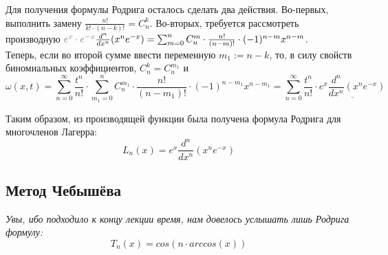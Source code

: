 \documentclass[12pt]{article}
\begin{document}
	Для получения формулы Родрига осталось сделать два действия. Во-первых, выполнить замену $\frac{n!}{k! \cdot (n-k)!} = C_n^k$.
	Во-вторых, требуется рассмотреть производную ${\color{gray}e^x \cdot e^{-x}} \frac{d^n}{dx^n}(x^n e^{-x}) 
	= \sum_{m=0}^n C_n^m \cdot \frac{n!}{(n-m)!} \cdot (-1)^{n-m} x^{n-m}$. \\
	Теперь, если во второй сумме ввести переменную $m_1 := n - k$, то, в силу свойств биномиальных коэффициентов, $C_n^k = C_n^{m_1}$ и
	$$\omega(x,t) = \sum_{n=0}^{\infty} \frac{t^n}{n!} \cdot \sum_{m_1=0}^{n} C_n^{m_1} \cdot \frac{n!}{(n-m_1)!}
	\cdot (-1)^{n-m_1} x^{n-m_1} = \sum_{n=0}^{\infty} \frac{t^n}{n!} \cdot \underline{e^x \frac{d^n}{dx^n}(x^n e^{-x})}$$
	
	Таким образом, из производящей функции была получена формула Родрига для многочленов Лагерра:
	$$L_n(x) = e^x \frac{d^n}{dx^n}(x^n e^{-x})$$
	
	\subsection{Метод Чебышёва}
	\textit{Увы, ибо подходило к концу лекции время, нам довелось услышать лишь Родрига формулу:}
	$$T_n(x) = cos(n \cdot arccos(x))$$
\end{document}

